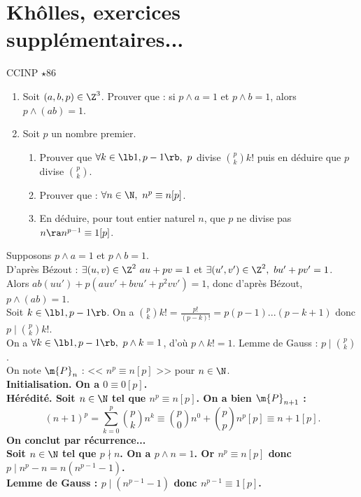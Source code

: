 \documentclass[11pt]{article}
\begin{document}
\fin

\pagebreak

\section{Khôlles, exercices supplémentaires...}


\begin{exercice}{CCINP $\star$}{86}
    \begin{enumerate}
        \item Soit $(a,b,p)\in\Z^3$. Prouver que : si $p\land a=1$ et $p\land b=1$, alors $p\land(ab)=1$.
        \item Soit $p$ un nombre premier.
        \begin{enumerate}
            \item Prouver que $\forall k \in \lb1,p-1\rb, ~ p$ divise $\binom{p}{k}k!$ puis en déduire que $p$ divise $\binom{p}{k}$.
            \item Prouver que : $\forall n \in \N, ~ n^p\equiv n[p]$.
            \item En déduire, pour tout entier naturel $n$, que $p$ ne divise pas $n\ra n^{p-1}\equiv1[p]$.
        \end{enumerate}
    \end{enumerate}
    \tcblower
     Supposons $p\land a = 1$ et $p\land b=1$.\\
    D'après Bézout : $\exists (u,v)\in\Z^2 ~ au+pv=1$ et $\exists (u',v')\in\Z^2, ~ bu'+pv'=1$.\\
    Alors $ab(uu')+p(auv'+bvu'+p^2vv')=1$, donc d'après Bézout, $p\land(ab)=1$.\\
     Soit $k\in\lb1,p-1\rb$. On a $\binom{p}{k}k!=\frac{p!}{(p-k)!}=p(p-1)...(p-k+1)$ donc $p\mid\binom{p}{k}k!$.\\
    On a $\forall k \in \lb 1, p-1\rb, ~ p \land k = 1$, d'où $p\land k! = 1$. Lemme de Gauss : $p\mid \binom{p}{k}$.\\
     On note $\m{P}_n$ : << $n^p\equiv n[p]$ >> pour $n\in\N$.\\
    \bf{Initialisation.} On a $0\equiv0[p]$.\\
    \bf{Hérédité.} Soit $n\in\N$ tel que $n^p\equiv n[p]$. On a bien $\m{P}_{n+1}$ :
    \begin{equation*}
        (n+1)^p=\sum_{k=0}^p\binom{p}{k}n^k\equiv\binom{p}{0}n^0+\binom{p}{p}n^p[p]\equiv n+1[p].
    \end{equation*}
    On conclut par récurrence...\\
     Soit $n\in\N$ tel que $p\nmid n$. On a $p\land n=1$. Or $n^p\equiv n[p]$ donc $p\mid n^p-n=n(n^{p-1}-1)$.\\
    Lemme de Gauss : $p\mid (n^{p-1}-1)$ donc $n^{p-1}\equiv1[p]$.
\end{exercice}
\end{document}
